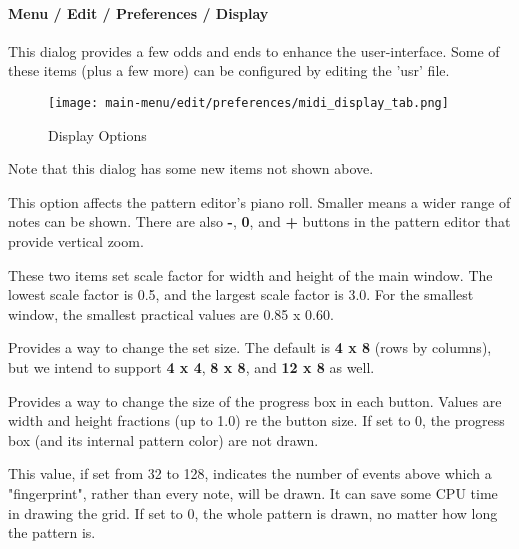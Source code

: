 \paragraph{Menu / Edit / Preferences / Display}
\label{paragraph:menu_edit_preferences_display}

   This dialog provides a few odds and ends to enhance the user-interface.
   Some of these items (plus a few more) can be configured by editing the 'usr'
   file.

\begin{figure}[H]
   \centering 
   \texttt{[image: main-menu/edit/preferences/midi\_display\_tab.png]}
   \caption{Display Options}
   \label{fig:midi_display_tab}
\end{figure}

   Note that this dialog has some new items not shown above.

   \setcounter{ItemCounter}{0}      %

   This option affects the pattern editor's piano roll.  Smaller means a wider
   range of notes can be shown.  There are also
   \textbf{-},
   \textbf{0}, and
   \textbf{+} buttons in the pattern editor that provide
   vertical zoom.

   These two items set scale factor for width and height of the main window.
   The lowest scale factor is 0.5, and the largest scale factor is 3.0.
   For the smallest window, the smallest practical values are 0.85 x 0.60.

   Provides a way to change the set size.  The default is
   \textbf{4 x 8}
   (rows by columns), but we intend to support
   \textbf{4 x 4},
   \textbf{8 x 8}, and
   \textbf{12 x 8}
   as well.

   Provides a way to change the size of the progress box in each button.
   Values are width and height fractions (up to 1.0) re the button size.
   If set to 0, the progress box (and its internal pattern color) are not
   drawn.

   This value, if set from 32 to 128, indicates the number of events above
   which a "fingerprint", rather than every note, will be drawn.  It can
   save some CPU time in drawing the grid.  If set to 0, the whole
   pattern is drawn, no matter how long the pattern is.

